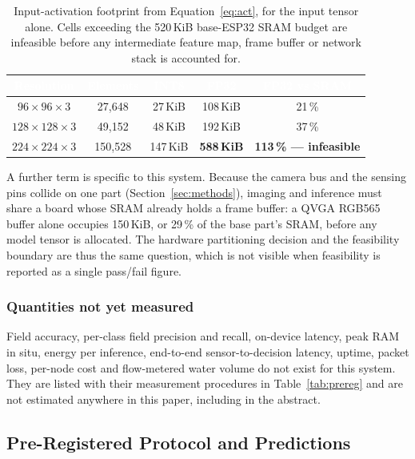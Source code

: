 \documentclass[journal]{IEEEtran}
\newcommand{\hd}[1]{\textcolor{white}{\textbf{#1}}}
\begin{document}
\begin{table}[t]
\centering
\caption{Input-activation footprint from Equation~\ref{eq:act}, for the
input tensor alone. Cells exceeding the 520\,KiB base-ESP32 SRAM budget
are infeasible before any intermediate feature map, frame buffer or network
stack is accounted for.}
\label{tab:actmem}
\footnotesize
\setlength{\tabcolsep}{4pt}
\begin{tabular}{ccccc}
\rowcolor{hdr}
\hd{Resolution} & \hd{Elements} & \hd{INT8} & \hd{FP32} &
\hd{FP32 vs SRAM} \\
\midrule
\rowcolor{rowlite}
$96\times96\times3$ & 27{,}648 & 27\,KiB & 108\,KiB & 21\,\% \\
$128\times128\times3$ & 49{,}152 & 48\,KiB & 192\,KiB & 37\,\% \\
\rowcolor{pend}
$224\times224\times3$ & 150{,}528 & 147\,KiB & \textbf{588\,KiB} &
\textcolor{warnred}{\textbf{113\,\% --- infeasible}} \\
\bottomrule
\end{tabular}
\end{table}

A further term is specific to this system. Because the camera bus and the
sensing pins collide on one part (Section~\ref{sec:methods}), imaging and
inference must share a board whose SRAM already holds a frame buffer: a
QVGA RGB565 buffer alone occupies 150\,KiB, or 29\,\% of the base part's
SRAM, before any model tensor is allocated. The hardware partitioning
decision and the feasibility boundary are thus the same question, which is
not visible when feasibility is reported as a single pass/fail figure.

\subsubsection{Quantities not yet measured}

Field accuracy, per-class field precision and recall, on-device latency,
peak RAM in situ, energy per inference, end-to-end sensor-to-decision
latency, uptime, packet loss, per-node cost and flow-metered water volume
do not exist for this system. They are listed with their measurement
procedures in Table~\ref{tab:prereg} and are not estimated anywhere in this
paper, including in the abstract.

\subsection{Pre-Registered Protocol and Predictions}
\label{sec:prereg}
\end{document}
